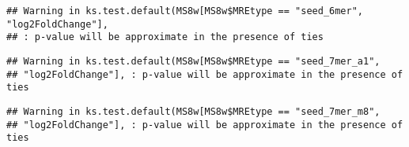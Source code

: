 \documentclass[
]{article}
\newenvironment{Shaded}{\begin{snugshade}}{\end{snugshade}}
\newcommand{\FunctionTok}[1]{\textcolor[rgb]{0.13,0.29,0.53}{\textbf{#1}}}
\newcommand{\NormalTok}[1]{#1}
\newcommand{\OtherTok}[1]{\textcolor[rgb]{0.56,0.35,0.01}{#1}}
\newcommand{\SpecialCharTok}[1]{\textcolor[rgb]{0.81,0.36,0.00}{\textbf{#1}}}
\newcommand{\StringTok}[1]{\textcolor[rgb]{0.31,0.60,0.02}{#1}}
\begin{document}
\begin{verbatim}
## Warning in ks.test.default(MS8w[MS8w$MREtype == "seed_6mer", "log2FoldChange"],
## : p-value will be approximate in the presence of ties
\end{verbatim}

\begin{Shaded}
\end{Shaded}

\begin{verbatim}
## Warning in ks.test.default(MS8w[MS8w$MREtype == "seed_7mer_a1",
## "log2FoldChange"], : p-value will be approximate in the presence of ties
\end{verbatim}

\begin{Shaded}
\end{Shaded}

\begin{verbatim}
## Warning in ks.test.default(MS8w[MS8w$MREtype == "seed_7mer_m8",
## "log2FoldChange"], : p-value will be approximate in the presence of ties
\end{verbatim}

\begin{Shaded}
\end{Shaded}
\end{document}
